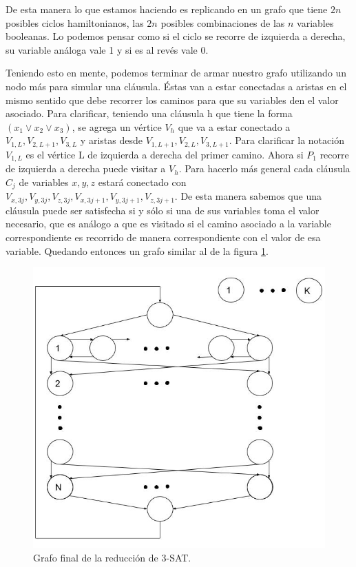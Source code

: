 \documentclass[a4paper,10pt]{article}
\begin{document}
	De esta manera lo que estamos haciendo es replicando en un grafo que tiene $2n$ posibles ciclos hamiltonianos, las $2n$ posibles combinaciones de las $n$ variables booleanas. Lo podemos pensar como si el ciclo se recorre de izquierda a derecha, su variable análoga vale 1 y si es al revés vale 0.

	Teniendo esto en mente, podemos terminar de armar nuestro grafo utilizando un nodo más para simular una cláusula. Éstas van a estar conectadas a aristas en el mismo sentido que debe recorrer los caminos para que su variables den el valor asociado. Para clarificar, teniendo una cláusula h que tiene la forma $(x_1 \vee x_2 \vee x_3)$, se agrega un vértice $V_h$ que va a estar conectado a $V_{1,L}, V_{2,L+1}, V_{3,L}$ y aristas desde $V_{1,L+1}, V_{2,L}, V_{3,L+1}$. Para clarificar la notación $V_{1,L}$ es el vértice L de izquierda a derecha del primer camino. Ahora si $P_1$ recorre de izquierda a derecha puede visitar a $V_h$. Para hacerlo más general cada cláusula $C_j$ de variables $x, y, z$ estará conectado con $V_{x,3j}, V_{y,3j}, V_{z,3j}, V_{x,3j+1}, V_{y,3j+1}, V_{z,3j+1}$. De esta manera sabemos que una cláusula puede ser satisfecha si y sólo si una de sus variables toma el valor necesario, que es análogo a que es visitado si el camino asociado a la variable correspondiente es recorrido de manera correspondiente con el valor de esa variable. Quedando entonces un grafo similar al de la figura \ref{fig:punto-3-2}.

	\begin{figure}[!htb]
		\centering
		\includegraphics[scale=0.35]{images/grafo-3-2.jpg}
		\caption{Grafo final de la reducción de 3-SAT.}
		\label{fig:punto-3-2}
	\end{figure}
\end{document}
